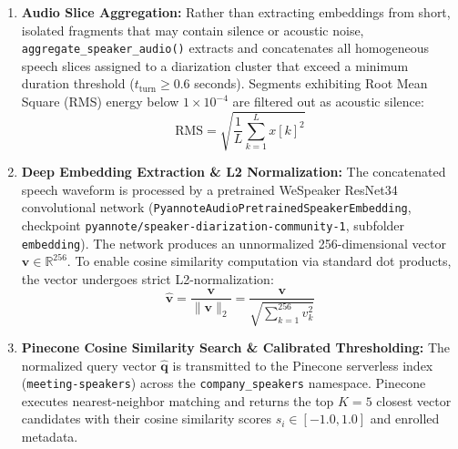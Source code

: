 \documentclass[12pt,oneside,letterpaper]{report}
\numberwithin{equation}{chapter} %
\begin{document}
\begin{enumerate}
    \item \textbf{Audio Slice Aggregation:} Rather than extracting embeddings from short, isolated fragments that may contain silence or acoustic noise, \texttt{aggregate\_speaker\_audio()} extracts and concatenates all homogeneous speech slices assigned to a diarization cluster that exceed a minimum duration threshold ($t_{\text{turn}} \ge 0.6$ seconds). Segments exhibiting Root Mean Square (RMS) energy below $1 \times 10^{-4}$ are filtered out as acoustic silence:
    \begin{equation}
    \text{RMS} = \sqrt{\frac{1}{L} \sum_{k=1}^L x[k]^2}
    \label{eq:rms_energy}
    \end{equation}

    \item \textbf{Deep Embedding Extraction \& L2 Normalization:} The concatenated speech waveform is processed by a pretrained WeSpeaker ResNet34 convolutional network (\texttt{PyannoteAudioPretrainedSpeakerEmbedding}, checkpoint \texttt{pyannote/speaker-diarization-community-1}, subfolder \texttt{embedding}). The network produces an unnormalized 256-dimensional vector $\mathbf{v} \in \mathbb{R}^{256}$. To enable cosine similarity computation via standard dot products, the vector undergoes strict L2-normalization:
    \begin{equation}
    \hat{\mathbf{v}} = \frac{\mathbf{v}}{\|\mathbf{v}\|_2} = \frac{\mathbf{v}}{\sqrt{\sum_{k=1}^{256} v_k^2}}
    \label{eq:l2_norm}
    \end{equation}

    \item \textbf{Pinecone Cosine Similarity Search \& Calibrated Thresholding:} The normalized query vector $\hat{\mathbf{q}}$ is transmitted to the Pinecone serverless index (\texttt{meeting-speakers}) across the \texttt{company\_speakers} namespace. Pinecone executes nearest-neighbor matching and returns the top $K=5$ closest vector candidates with their cosine similarity scores $s_i \in [-1.0, 1.0]$ and enrolled metadata.


\end{enumerate}
\end{document}

